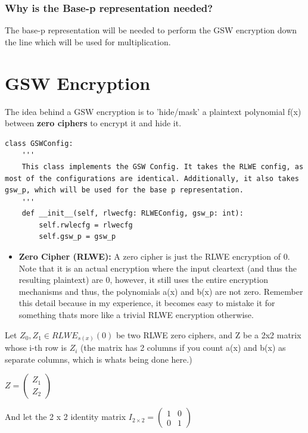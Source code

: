 \documentclass{report}
\begin{document}
	\subsubsection{Why is the Base-p representation needed?}
	The base-p representation will be needed to perform the GSW encryption down the line which will be used for multiplication.
	
	\section{GSW Encryption}
	The idea behind a GSW encryption is to 'hide/mask' a plaintext polynomial f(x) between \textbf{zero ciphers} to encrypt it and hide it. 
\begin{verbatim}
class GSWConfig:
	'''
	This class implements the GSW Config. It takes the RLWE config, as most of the configurations are identical. Additionally, it also takes gsw_p, which will be used for the base p representation.
	'''
	def __init__(self, rlwecfg: RLWEConfig, gsw_p: int):
		self.rwlecfg = rlwecfg
		self.gsw_p = gsw_p
\end{verbatim}
	
	\begin{itemize}
		\item \textbf{Zero Cipher (RLWE):} A zero cipher is just the RLWE encryption of 0. Note that it is an actual encryption where the input cleartext (and thus the resulting plaintext) are 0, however, it still uses the entire encryption mechanisms and thus, the polynomials a(x) and b(x) are not zero. Remember this detail because in my experience, it becomes easy to mistake it for something thats more like a trivial RLWE encryption otherwise.
	\end{itemize}
	
	Let $Z_0, Z_1 \in RLWE_{s(x)} (0)$ be two RLWE zero ciphers, and Z be a 2x2 matrix whose i-th row is $Z_i$ (the matrix has 2 columns if you count a(x) and b(x) as separate columns, which is whats being done here.)
	\begin{center}
		$Z = \begin{pmatrix}
			Z_1 \\
			Z_2
		\end{pmatrix}$
	\end{center}
	And let the 2 x 2 identity matrix $I_{2 \times 2} = \begin{pmatrix}
		1 & 0\\
		0 & 1
	\end{pmatrix}$\newline
	
\end{document}

